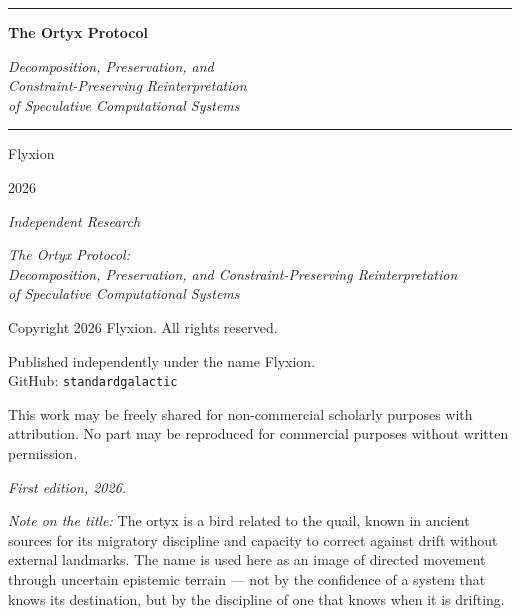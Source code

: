 \documentclass[12pt,twoside,openright]{book}
\begin{document}

\frontmatter

\begin{titlepage}
\thispagestyle{empty}
\vspace*{0.10\textheight}
{\centering
  {\color{Ortyx@subtle}\rule{0.55\textwidth}{0.4pt}}\par
  \vspace{20pt}
  {\color{Ortyx@rule}\fontsize{28}{34}\selectfont\bfseries
    The Ortyx Protocol}\par
  \vspace{16pt}
  {\color{Ortyx@neutral}\large\itshape
    Decomposition, Preservation, and\\[4pt]
    Constraint-Preserving Reinterpretation\\[4pt]
    of Speculative Computational Systems}\par
  \vspace{22pt}
  {\color{Ortyx@subtle}\rule{0.55\textwidth}{0.4pt}}\par
  \vspace{36pt}
  {\color{Ortyx@neutral}\Large Flyxion}\par
  \vspace{12pt}
  {\color{Ortyx@neutral}\normalsize 2026}\par
  \vfill
  {\color{Ortyx@neutral}\small\itshape
    Independent Research}\par
  \vspace{20pt}
}
\end{titlepage}

\thispagestyle{empty}
\vspace*{\fill}
{\small\color{Ortyx@neutral}
\noindent
\textit{The Ortyx Protocol:\\
Decomposition, Preservation, and Constraint-Preserving Reinterpretation\\
of Speculative Computational Systems}

\medskip
\noindent
Copyright \textcopyright{} 2026 Flyxion. All rights reserved.

\medskip
\noindent
Published independently under the name Flyxion.\\
GitHub: \texttt{standardgalactic}

\medskip
\noindent
This work may be freely shared for non-commercial scholarly purposes
with attribution. No part may be reproduced for commercial purposes
without written permission.

\medskip
\noindent
\textit{First edition, 2026.}

\vspace{16pt}
\noindent
\textit{Note on the title:} The ortyx is a bird related to the quail,
known in ancient sources for its migratory discipline and capacity to
correct against drift without external landmarks. The name is used here
as an image of directed movement through uncertain epistemic terrain ---
not by the confidence of a system that knows its destination, but by the
discipline of one that knows when it is drifting.
}
\vspace*{\fill}
\clearpage
\end{document}
